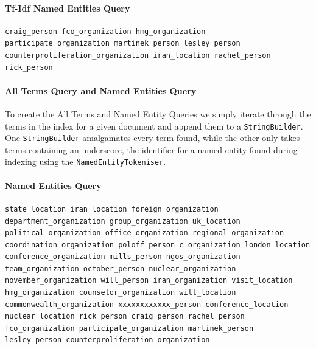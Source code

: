 \documentclass{l4proj}
\newcommand{\code}[1]{\texttt{#1}}
\begin{document}
\paragraph{Tf-Idf Named Entities Query}
\begin{verbatim}
craig_person fco_organization hmg_organization participate_organization martinek_person lesley_person counterproliferation_organization iran_location rachel_person rick_person
\end{verbatim}

\paragraph{All Terms Query and Named Entities Query}
To create the All Terms and Named Entity Queries we simply iterate through the terms in the index for a given document and append them to a \code{StringBuilder}. One \code{StringBuilder} amalgamates every term found, while the other only takes terms containing an underscore, the identifier for a named entity found during indexing using the \code{NamedEntityTokeniser}. 
\paragraph{Named Entities Query}
\begin{verbatim}
state_location iran_location foreign_organization department_organization group_organization uk_location political_organization office_organization regional_organization coordination_organization poloff_person c_organization london_location conference_organization mills_person ngos_organization team_organization october_person nuclear_organization november_organization will_person iran_organization visit_location hmg_organization counselor_organization will_location commonwealth_organization xxxxxxxxxxxx_person conference_location nuclear_location rick_person craig_person rachel_person fco_organization participate_organization martinek_person lesley_person counterproliferation_organization
\end{verbatim}
\end{document}
